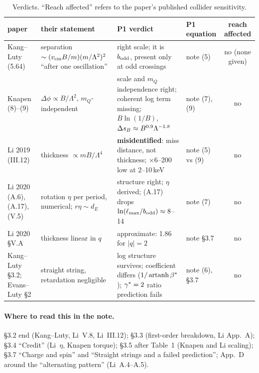 \documentclass[11pt]{article}
\begin{document}
\begin{table}[H]
\centering\small
\caption{Verdicts. ``Reach affected'' refers to the paper's published collider sensitivity.}
\label{tab:summary}
\begin{tabularx}{\linewidth}{>{\raggedright\arraybackslash}p{2.3cm}>{\raggedright\arraybackslash}X>{\raggedright\arraybackslash}X>{\raggedright\arraybackslash}p{2.4cm}c}
\toprule
paper & their statement & P1 verdict & P1 equation & reach affected\\
\midrule
Kang--Luty (5.64) & separation $\sim(v_{\rm cm}B/m)(m/\Lambda^2)^2$ ``after one oscillation'' &
  right scale; it is $b_{\rm odd}$, present only at odd crossings & note (5) & no (none given)\\
Knapen (8)--(9) & $\Delta\phi\propto B/\Lambda^2$, $m_Q$-independent & scale and $m_Q$ independence right;
  coherent log term missing; $B\ln(1/B)$, $\Delta s_B\approx B^{0.9}\Lambda^{-1.8}$ & note (7), (9) & no\\
Li 2019 (III.12) & thickness $\propto mB/\Lambda^4$ & \textbf{misidentified}: miss distance, not thickness;
  $\times6$--200 low at 2--10\,keV & note (5) vs (9) & no\\
Li 2020 (A.6), (A.17), (V.5) & rotation $\eta$ per period, numerical; $r\eta\sim d_E$ & structure right; $\eta$
  derived; (A.17) drops $\ln(\ell_{\max}/b_{\rm odd})\approx8$--14 & note (7) & no\\
Li 2020 \S V.A & thickness linear in $q$ & approximate: 1.86 for $|q|=2$ & note \S3.7 & no\\
Kang--Luty \S3.2; Evans--Luty \S2 & straight string, retardation negligible & log structure survives; coefficient
  differs ($1/\operatorname{artanh}\beta^*$); $\gamma^*=2$ ratio prediction fails & note (6), \S3.7 & no\\
\bottomrule
\end{tabularx}
\end{table}

\paragraph{Where to read this in the note.} \S3.2 end (Kang--Luty, Li~V.8, Li~III.12); \S3.3 (first-order breakdown, Li App.~A);
\S3.4 ``Credit'' (Li~$\eta$, Knapen torque); \S3.5 after Table~1 (Knapen and Li scaling); \S3.7 ``Charge and spin'' and
``Straight strings and a failed prediction''; App.~D around the ``alternating pattern'' (Li~A.4--A.5).
\end{document}

